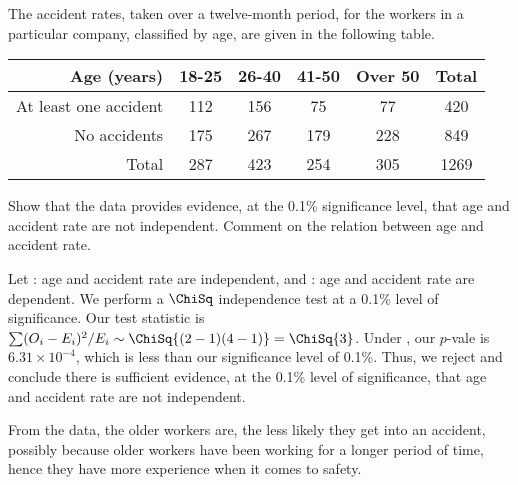\begin{problem}
    The accident rates, taken over a twelve-month period, for the workers in a particular company, classified by age, are given in the following table.

    \begin{table}[H]
        \centering
        \begin{tabular}{|r|c|c|c|c|c|}
        \hline
        Age (years) & 18-25 & 26-40 & 41-50 & Over 50 & Total \\ \hline
        At least one accident & 112 & 156 & 75 & 77 & 420 \\ \hline
        No accidents & 175 & 267 & 179 & 228 & 849 \\ \hline
        Total & 287 & 423 & 254 & 305 & 1269 \\ \hline
        \end{tabular}
    \end{table}

    Show that the data provides evidence, at the 0.1\% significance level, that age and accident rate are not independent. Comment on the relation between age and accident rate.
\end{problem}
\begin{solution}
    Let \nullhyp: age and accident rate are independent, and \althyp: age and accident rate are dependent. We perform a $\ChiSq$ independence test at a 0.1\% level of significance. Our test statistic is $\sum (O_i - E_i)^2/E_i \sim \ChiSq{(2-1)(4-1)} = \ChiSq{3}$. Under \nullhyp, our $p$-vale is $6.31 \times 10^{-4}$, which is less than our significance level of 0.1\%. Thus, we reject \nullhyp{} and conclude there is sufficient evidence, at the 0.1\% level of significance, that age and accident rate are not independent.

    From the data, the older workers are, the less likely they get into an accident, possibly because older workers have been working for a longer period of time, hence they have more experience when it comes to safety.
\end{solution}

